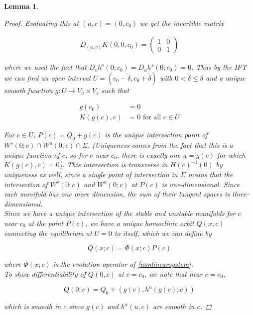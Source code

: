 \documentclass[12pt]{article}
\newtheorem{lemma}{Lemma}
\begin{document}
\begin{lemma}
\begin{proof}
Evaluating this at $(u, c) = (0, c_0)$ we get the invertible matrix

\begin{align*}
D_{(u, v)}K(0, 0, c_0) = \begin{pmatrix}
1 & 0 \\
0 & 1
\end{pmatrix}
\end{align*}

where we used the fact that $D_v h^s(0; c_0) = D_u h^s(0; c_0) = 0$. Thus by the IFT we can find an open interval $U = (c_0 - \tilde{\delta}, c_0 + \tilde{\delta})$ with $0 < \tilde{\delta} \leq \delta$ and a unique smooth function $g: U \rightarrow V_u \times V_s$ such that

\begin{align*}
g(c_0) &= 0 \\
K(g(c), c) &= 0 \text{ for all } c \in U
\end{align*}

For $c \in U$, $P(c) = Q_0 + g(c)$ is the unique intersection point of $W^s(0; c) \cap W^u(0; c) \cap \Sigma$. (Uniqueness comes from the fact that this is a unique function of $c$, so for $c$ near $c_0$, there is exactly one $u = g(c)$ for which $K(g(c),c) = 0$). This intersection is transverse in $H(c)^{-1}(0)$ by uniqueness as well, since a single point of intersection in $\Sigma$ means that the intersection of $W^s(0; c)$ and $W^u(0; c)$ at $P(c)$ is one-dimensional. Since each manifold has one more dimension, the sum of their tangent spaces is three-dimensional.\\

Since we have a unique intersection of the stable and unstable manifolds for $c$ near $c_0$ at the point $P(c)$, we have a unique homoclinic orbit $Q(x; c)$ connecting the equilibrium at $U = 0$ to itself, which we can define by

\[
Q(x; c) = \Phi(x; c) P(c)
\]

where $\Phi(x; c)$ is the evolution operator of \eqref{nonlinearsystem}.\\

To show differentiability of $Q(0, c)$ at $c = c_0$, we note that near $c = c_0$,

\[
Q(0; c) = Q_0 + (g(c), h^u(g(c); c))
\]

which is smooth in $c$ since $g(c)$ and $h^u(u, c)$ are smooth in $c$.

\end{proof}
\end{lemma}
\end{document}
